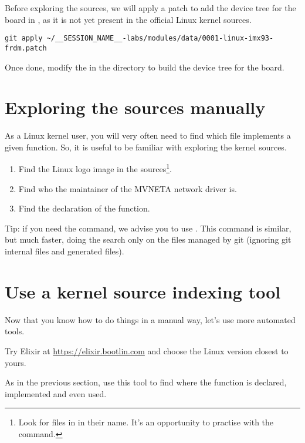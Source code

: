 \if{}
Before exploring the sources, we will apply a patch to add the device
tree for the  board in , as it is not yet present in the official Linux kernel sources.
\begin{verbatim}
git apply ~/__SESSION_NAME__-labs/modules/data/0001-linux-imx93-frdm.patch
\end{verbatim}
Once done, modify the  in the  directory to build
the device tree for the  board.
\fi

\section{Exploring the sources manually}

As a Linux kernel user, you will very often need to find which file
implements a given function. So, it is useful to be familiar with
exploring the kernel sources.

\begin{enumerate}
\item Find the Linux logo image in the sources\footnote{Look for
      files in  in their name. It's an
      opportunity to practise with the  command.}.
\item Find who the maintainer of the MVNETA network driver is.
\item Find the declaration of the  function.
\end{enumerate}

Tip: if you need the  command, we advise you to use . This command is similar, but much faster, doing the search only
on the files managed by git (ignoring git internal files and generated
files).

\section{Use a kernel source indexing tool}

Now that you know how to do things in a manual way, let's use more
automated tools.

Try Elixir at \url{https://elixir.bootlin.com}
and choose the Linux version closest to yours.

As in the previous section, use this tool to find where
the  function is declared, implemented and
even used.
